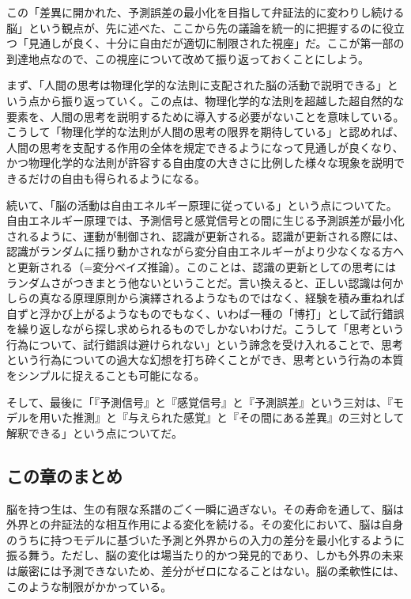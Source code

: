 この「差異に開かれた、予測誤差の最小化を目指して弁証法的に変わりし続ける脳」という観点が、先に述べた、ここから先の議論を統一的に把握するのに役立つ「見通しが良く、十分に自由だが適切に制限された視座」だ。ここが第一部の到達地点なので、この視座について改めて振り返っておくことにしよう。

まず、「人間の思考は物理化学的な法則に支配された脳の活動で説明できる」という点から振り返っていく。この点は、物理化学的な法則を超越した超自然的な要素を、人間の思考を説明するために導入する必要がないことを意味している。こうして「物理化学的な法則が人間の思考の限界を期待している」と認めれば、人間の思考を支配する作用の全体を規定できるようになって見通しが良くなり、かつ物理化学的な法則が許容する自由度の大きさに比例した様々な現象を説明できるだけの自由も得られるようになる。

続いて、「脳の活動は自由エネルギー原理に従っている」という点についてた。自由エネルギー原理では、予測信号と感覚信号との間に生じる予測誤差が最小化されるように、運動が制御され、認識が更新される。認識が更新される際には、認識がランダムに揺り動かされながら変分自由エネルギーがより少なくなる方へと更新される（=変分ベイズ推論）。このことは、認識の更新としての思考にはランダムさがつきまとう他ないということだ。言い換えると、正しい認識は何かしらの真なる原理原則から演繹されるようなものではなく、経験を積み重ねれば自ずと浮かび上がるようなものでもなく、いわば一種の「博打」として試行錯誤を繰り返しながら探し求められるものでしかないわけだ。こうして「思考という行為について、試行錯誤は避けられない」という諦念を受け入れることで、思考という行為についての過大な幻想を打ち砕くことができ、思考という行為の本質をシンプルに捉えることも可能になる。

そして、最後に「『予測信号』と『感覚信号』と『予測誤差』という三対は、『モデルを用いた推測』と『与えられた感覚』と『その間にある差異』の三対として解釈できる」という点についてだ。

\subsection{この章のまとめ}\label{ux3053ux306eux7ae0ux306eux307eux3068ux3081}

脳を持つ生は、生の有限な系譜のごく一瞬に過ぎない。その寿命を通して、脳は外界との弁証法的な相互作用による変化を続ける。その変化において、脳は自身のうちに持つモデルに基づいた予測と外界からの入力の差分を最小化するように振る舞う。ただし、脳の変化は場当たり的かつ発見的であり、しかも外界の未来は厳密には予測できないため、差分がゼロになることはない。脳の柔軟性には、このような制限がかかっている。
